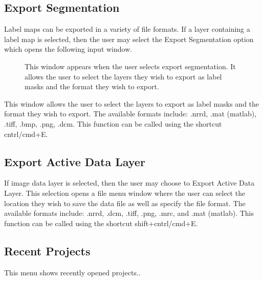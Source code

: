 \documentclass[fleqn,11pt,openany]{book}
\begin{document}
\subsection{Export Segmentation}
Label maps can be exported in a variety of file formats.  If a layer containing a label map is selected, then the user may select the Export Segmentation option which opens the following input window.

\begin{figure}[h!]
\caption{This window appears when the user selects export segmentation.  It allows the user to select the layers they wish to export as label masks and the format they wish to export.}\label{fig:ExportSeg}
\end{figure}

This window allows the user to select the layers to export as label masks and the format they wish to export.  The available formats include: .nrrd, .mat (matlab), .tiff, .bmp, .png, .dcm. This function can be called using the shortcut cntrl/cmd+E.

\subsection{Export Active Data Layer}

If image data layer is selected, then the user may choose to Export Active Data Layer. This selection opens a file menu window where the user can select the location they wish to save the data file as well as specify the file format.  The available formats include: .nrrd, .dcm, .tiff, .png, .mrc, and .mat (matlab). This function can be called using the shortcut shift+cntrl/cmd+E.

\subsection{Recent Projects}
This menu shows recently opened projects..
\end{document}
